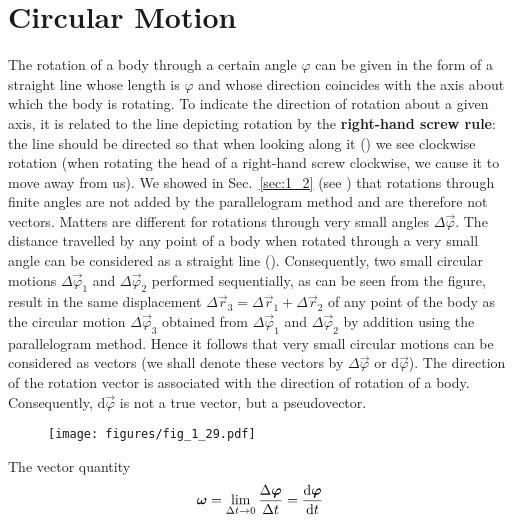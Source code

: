 \section{Circular Motion}\label{sec:1_5}

The rotation of a body through a certain angle $\varphi$ can be given in the form of a straight line whose length is $\varphi$ and whose direction coincides with the axis about which the body is rotating. To indicate the direction of rotation about a given axis, it is related to the line depicting rotation by the \textbf{right-hand screw rule}: the line should be directed so that when looking along it () we see clockwise rotation (when rotating the head of a right-hand screw clockwise, we cause it to move away from us). We showed in Sec.~\ref{sec:1_2} (see ) that rotations through finite angles are not added by the parallelogram method and are therefore not vectors. Matters are different for rotations through very small angles $\Delta\vec{\varphi}$. The distance travelled by any point of a body when rotated through a very small angle can be considered as a straight line (). Consequently, two small circular motions $\Delta\vec{\varphi}_1$ and $\Delta\vec{\varphi}_2$ performed sequentially, as can be seen from the figure, result in the same displacement $\Delta\vec{r}_3=\Delta\vec{r}_1+\Delta\vec{r}_2$ of any point of the body as the circular motion $\Delta\vec{\varphi}_3$ obtained from $\Delta\vec{\varphi}_1$ and $\Delta\vec{\varphi}_2$ by addition using the parallelogram method. Hence it follows that very small circular motions can be considered as vectors (we shall denote these vectors by $\Delta\vec{\varphi}$ or $\mathrm{d}\vec{\varphi}$). The direction of the rotation vector is associated with the direction of rotation of a body. Consequently, $\mathrm{d}\vec{\varphi}$ is not a true vector, but a pseudovector.

\begin{figure}[t]
	\begin{center}
		\texttt{[image: figures/fig\_1\_29.pdf]}
		\caption[]{}
		\label{fig:1_29}
	\end{center}
	\vspace{-0.7cm}
\end{figure}

The vector quantity
\begin{equation}\label{eq:1_93}
\boldsymbol{\omega} = \lim_{\Delta t\to 0} \frac{\Delta\boldsymbol{\varphi}}{\Delta t} = \frac{\mathrm{d}\boldsymbol{\varphi}}{\mathrm{d} t}
\end{equation}

